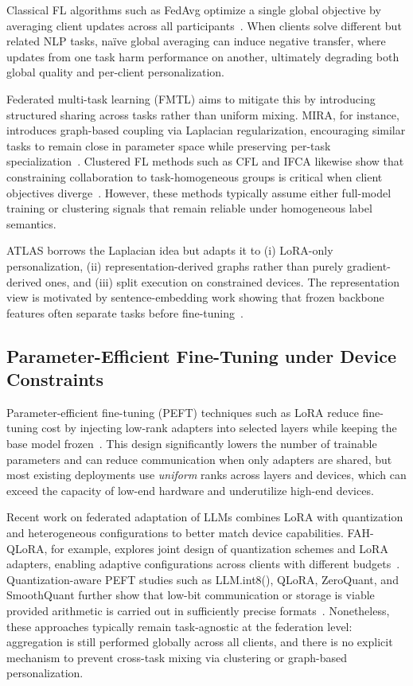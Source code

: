 \documentclass[conference]{IEEEtran}
\begin{document}
Classical FL algorithms such as FedAvg optimize a single global objective by averaging client updates across all participants~\cite{fedavg}. When clients solve different but related NLP tasks, na\"{i}ve global averaging can induce negative transfer, where updates from one task harm performance on another, ultimately degrading both global quality and per-client personalization.

Federated multi-task learning (FMTL) aims to mitigate this by introducing structured sharing across tasks rather than uniform mixing. MIRA, for instance, introduces graph-based coupling via Laplacian regularization, encouraging similar tasks to remain close in parameter space while preserving per-task specialization~\cite{mira}. Clustered FL methods such as CFL and IFCA likewise show that constraining collaboration to task-homogeneous groups is critical when client objectives diverge~\cite{cfl,ifca}. However, these methods typically assume either full-model training or clustering signals that remain reliable under homogeneous label semantics.

ATLAS borrows the Laplacian idea but adapts it to (i) LoRA-only personalization, (ii) representation-derived graphs rather than purely gradient-derived ones, and (iii) split execution on constrained devices. The representation view is motivated by sentence-embedding work showing that frozen backbone features often separate tasks before fine-tuning~\cite{sbert}.


\subsection{Parameter-Efficient Fine-Tuning under Device Constraints}

Parameter-efficient fine-tuning (PEFT) techniques such as LoRA reduce fine-tuning cost by injecting low-rank adapters into selected layers while keeping the base model frozen~\cite{lora}. This design significantly lowers the number of trainable parameters and can reduce communication when only adapters are shared, but most existing deployments use \emph{uniform} ranks across layers and devices, which can exceed the capacity of low-end hardware and underutilize high-end devices.

Recent work on federated adaptation of LLMs combines LoRA with quantization and heterogeneous configurations to better match device capabilities. FAH-QLoRA, for example, explores joint design of quantization schemes and LoRA adapters, enabling adaptive configurations across clients with different budgets~\cite{fah_qlora}. Quantization-aware PEFT studies such as LLM.int8(), QLoRA, ZeroQuant, and SmoothQuant further show that low-bit communication or storage is viable provided arithmetic is carried out in sufficiently precise formats~\cite{llm_int8,qlora,zeroquant,smoothquant}. Nonetheless, these approaches typically remain task-agnostic at the federation level: aggregation is still performed globally across all clients, and there is no explicit mechanism to prevent cross-task mixing via clustering or graph-based personalization.
\end{document}
